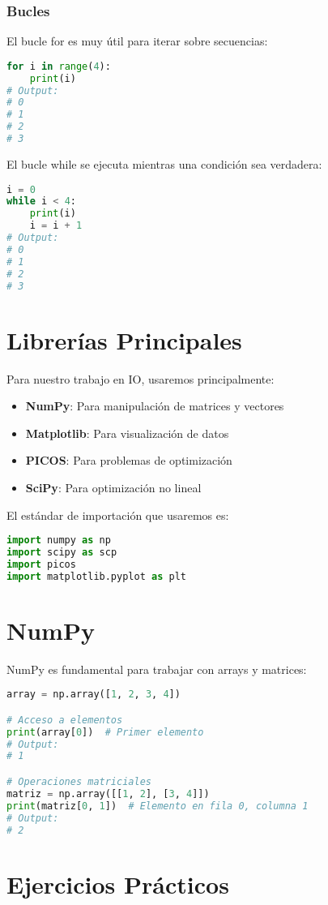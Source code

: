 \documentclass[12pt]{article}
\begin{document}
\subsubsection{Bucles}
El bucle for es muy útil para iterar sobre secuencias:
\begin{lstlisting}[language=Python]
for i in range(4):
    print(i)
# Output:
# 0
# 1
# 2
# 3
\end{lstlisting}

El bucle while se ejecuta mientras una condición sea verdadera:
\begin{lstlisting}[language=Python]
i = 0
while i < 4:
    print(i)
    i = i + 1
# Output:
# 0
# 1
# 2
# 3
\end{lstlisting}

\section{Librerías Principales}
Para nuestro trabajo en IO, usaremos principalmente:
\begin{itemize}
    \item \textbf{NumPy}: Para manipulación de matrices y vectores
    \item \textbf{Matplotlib}: Para visualización de datos
    \item \textbf{PICOS}: Para problemas de optimización
    \item \textbf{SciPy}: Para optimización no lineal
\end{itemize}

El estándar de importación que usaremos es:
\begin{lstlisting}[language=Python]
import numpy as np
import scipy as scp
import picos
import matplotlib.pyplot as plt
\end{lstlisting}

\section{NumPy}
NumPy es fundamental para trabajar con arrays y matrices:
\begin{lstlisting}[language=Python]
array = np.array([1, 2, 3, 4])

# Acceso a elementos
print(array[0])  # Primer elemento
# Output:
# 1

# Operaciones matriciales
matriz = np.array([[1, 2], [3, 4]])
print(matriz[0, 1])  # Elemento en fila 0, columna 1
# Output:
# 2
\end{lstlisting}

\section{Ejercicios Prácticos}
\end{document}
